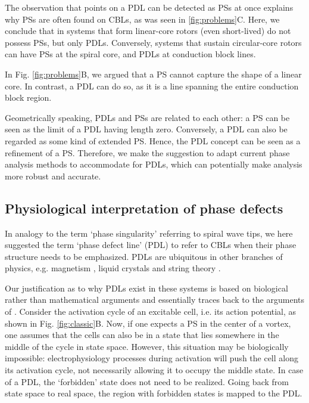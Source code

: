 \documentclass[aps,pre,amsfonts,amssymb,amsmath,twocolumn, superscriptaddress]{revtex4-1}
\begin{document}
The observation that points on a PDL can be detected as PSs at once explains why PSs are often found on CBLs, as was seen in \ref{fig:problems}C. Here, we conclude that in systems that form linear-core rotors (even short-lived) do not possess PSs, but only PDLs. Conversely, systems that sustain circular-core rotors can have PSs at the spiral core, and PDLs at conduction block lines. 

In Fig. \ref{fig:problems}B, we argued that a PS cannot capture the shape of a linear core. In contrast, a PDL can do so, as it is a line spanning the entire conduction block region. 

Geometrically speaking, PDLs and PSs are related to each other: a PS can be seen as the limit of a PDL having length zero. Conversely, a PDL can also be regarded as some kind of extended PS. Hence, the PDL concept can be seen as a refinement of a PS. Therefore, we make the suggestion to adapt current phase analysis methods to accommodate for PDLs, which can potentially make analysis more robust and accurate.  

\subsection{Physiological interpretation of phase defects}

In analogy to the term `phase singularity' referring to spiral wave tips, we here suggested the term `phase defect line' (PDL) to refer to CBLs when their phase structure needs to be emphasized. PDLs are ubiquitous in other branches of physics, e.g. magnetism \citep{Landau:1935}, liquid crystals \citep{Williams:1963} and string theory \citep{Vilenkin:1985}.

Our justification as to why PDLs exist in these systems is based on biological rather than mathematical arguments and essentially traces back to the arguments of \cite{Winfree:1974}. Consider the activation cycle of an excitable cell, i.e. its action potential, as shown in Fig. \ref{fig:classic}B. Now, if one expects a PS in the center of a vortex, one assumes that the cells can also be in a state that lies somewhere in the middle of the cycle in state space. However, this situation may be biologically impossible: electrophysiology processes during activation will push the cell along its activation cycle, not necessarily allowing it to occupy the middle state. In case of a PDL, the `forbidden' state does not need to be realized. Going back from state space to real space, the region with forbidden states is mapped to the PDL. 
\end{document}
